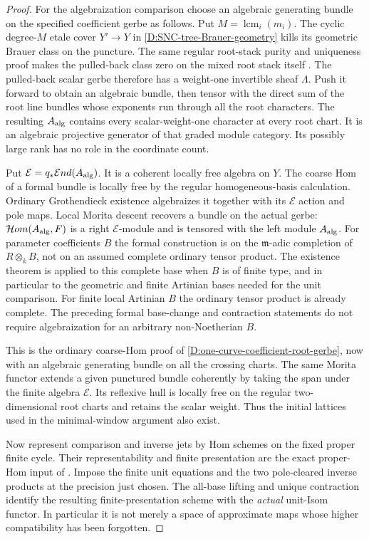\begin{proof}
For the algebraization comparison choose
an algebraic generating bundle on the
specified coefficient gerbe as follows.
Put $M=\operatorname{lcm}_i(m_i)$.
The cyclic degree-$M$ etale cover
$Y'\to Y$ in
\ref{D:SNC-tree-Brauer-geometry} kills
its geometric Brauer class on the
puncture. The same regular root-stack
purity and uniqueness proof makes the
pulled-back class zero on the mixed
root stack itself
\citep[Proposition3.2.1 and complete proof]
{Lieblich2011ResidualD}. The pulled-back
scalar gerbe therefore has a weight-one
invertible sheaf $\Lambda$. Push it
forward to obtain an algebraic bundle,
then tensor with the direct sum of
the root line bundles whose exponents
run through all the root characters.
The resulting $A_{\rm alg}$ contains
every scalar-weight-one character at
every root chart. It is an algebraic
projective generator of that graded
module category. Its possibly large
rank has no role in the coordinate
count.

Put $\mathcal E=q_*\mathcal End(A_{\rm alg})$.
It is a coherent locally free algebra
on $Y$. The coarse Hom of a formal
bundle is locally free by the regular
homogeneous-basis calculation. Ordinary
Grothendieck existence algebraizes it
together with its $\mathcal E$ action
and pole maps. Local Morita descent
recovers a bundle on the actual gerbe:
$\mathcal Hom(A_{\rm alg},F)$ is a
right $\mathcal E$-module and is tensored
with the left module $A_{\rm alg}$.
For parameter coefficients $B$ the
formal construction is on the
$\mathfrak m$-adic completion of
$R\otimes_k B$, not on an assumed
complete ordinary tensor product.
The existence theorem is applied to
this complete base when $B$ is of
finite type, and in particular to
the geometric and finite Artinian
bases needed for the unit comparison.
For finite local Artinian $B$ the
ordinary tensor product is already
complete. The preceding formal
base-change and contraction statements
do not require algebraization for
an arbitrary non-Noetherian $B$.

This is the ordinary coarse-Hom proof
of \ref{D:one-curve-coefficient-root-gerbe},
now with an algebraic generating bundle
on all the crossing charts. The same
Morita functor extends a given punctured
bundle coherently by taking the span
under the finite algebra $\mathcal E$.
Its reflexive hull is locally free
on the regular two-dimensional root
charts and retains the scalar weight.
Thus the initial lattices used in the
minimal-window argument also exist.

Now represent comparison and inverse jets
by Hom schemes on the fixed proper finite
cycle. Their representability and finite
presentation are the exact proper-Hom
input of \citep[Proposition99.3.10, Tag08K6]
{StacksUnitJetTransferD}. Impose the finite
unit equations and the two pole-cleared
inverse products at the precision just
chosen. The all-base lifting and unique
contraction identify the resulting
finite-presentation scheme with the
\emph{actual} unit-Isom functor. In
particular it is not merely a space
of approximate maps whose higher
compatibility has been forgotten.


\end{proof}
